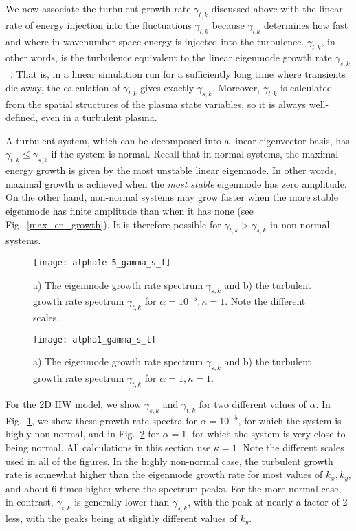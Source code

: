 \documentclass[letter,scriptaddress,twocolumn, prl,showkeys]{revtex4}
\begin{document}
We now associate the turbulent growth rate $\gamma_{t,k}$ discussed above with the linear rate of energy injection into the fluctuations $\gamma_{l,k}$ because $\gamma_{l.k}$
determines how fast and where in wavenumber space energy is injected into the turbulence.
$\gamma_{l,k}$, in other words, is the turbulence equivalent to the linear eigenmode growth rate $\gamma_{s,k}$~\cite{friedman2012b,terry2006b}. 
That is, in a linear simulation run for a sufficiently long time where transients die away, the calculation of $\gamma_{l,k}$ gives exactly $\gamma_{s,k}$.
Moreover, $\gamma_{l,k}$ is calculated from the spatial structures of the plasma state variables, so it is always well-defined, even in a turbulent plasma. 

A turbulent system, which can be decomposed into a linear eigenvector basis, has $\gamma_{t,k} \le \gamma_{s,k}$ if the system is normal. Recall that in normal systems, the maximal
energy growth is given by the most unstable linear eigenmode. In other words, maximal growth is achieved when the \emph{most stable} eigenmode has zero amplitude.
On the other hand, non-normal systems may grow faster when the more stable eigenmode has finite amplitude than when it has none (see Fig.~\ref{max_en_growth}). 
It is therefore possible for $\gamma_{t,k} > \gamma_{s,k}$ in non-normal systems. 

\begin{figure}
\centerline{\texttt{[image: alpha1e-5\_gamma\_s\_t]}}
\caption{a) The eigenmode growth rate spectrum $\gamma_{s,k}$ and b) the turbulent growth rate spectrum $\gamma_{t,k}$ for $\alpha = 10^{-5}, \kappa=1$. Note the different scales.}
\label{alpha1e-5_gamma_s_t}
\end{figure}

\begin{figure}
\centerline{\texttt{[image: alpha1\_gamma\_s\_t]}}
\caption{a) The eigenmode growth rate spectrum $\gamma_{s,k}$ and b) the turbulent growth rate spectrum $\gamma_{t,k}$ for $\alpha = 1, \kappa=1$.}
\label{alpha1_gamma_s_t}
\end{figure}

For the 2D HW model, we show
$\gamma_{s,k}$ and $\gamma_{t,k}$ for two different values of $\alpha$. In Fig.~\ref{alpha1e-5_gamma_s_t}, we show these growth rate spectra for $\alpha = 10^{-5}$, for which the system is
highly non-normal, and in Fig.~\ref{alpha1_gamma_s_t} for $\alpha = 1$, for which the system is very close to being normal. All calculations in this section use $\kappa=1$. 
Note the different scales used in all of the figures. In the highly
non-normal case, the turbulent growth rate is somewhat higher than the eigenmode growth rate for most values of $k_x,k_y$, and about 6 times higher where the spectrum peaks. For the more normal
case, in contrast, $\gamma_{t,k}$ is generally lower than $\gamma_{s,k}$, with the peak at nearly a factor of 2 less, with the peaks being at slightly different values of $k_y$.
\end{document}
